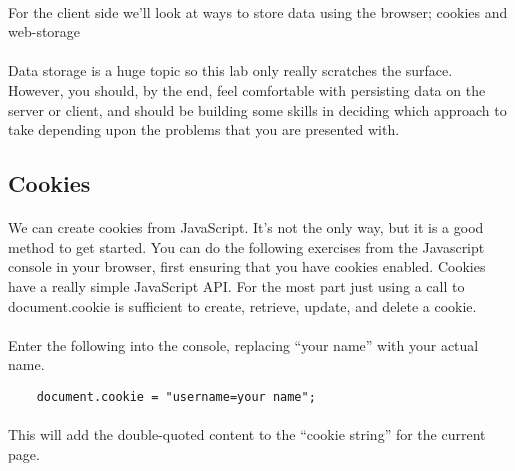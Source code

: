 \documentclass[10pt, a4paper, twosize]{article}
\begin{document}
\paragraph{} For the client side we'll look at ways to store data using the browser; cookies and web-storage%


\paragraph{} Data storage is a huge topic so this lab only really scratches the surface. However, you should, by the end, feel comfortable with persisting data on the server or client, and should be building some skills in deciding which approach to take depending upon the problems that you are presented with.

\subsection*{Cookies}
\paragraph{} We can create cookies from JavaScript. It's not the only way, but it is a good method to get started. You can do the following exercises from the Javascript console in your browser, first ensuring that you have cookies enabled. Cookies have a really simple JavaScript API. For the most part just using a call to document.cookie is sufficient to create, retrieve, update, and delete a cookie.

\paragraph{} Enter the following into the console, replacing ``your name'' with your actual name.
\begin{lstlisting}
    document.cookie = "username=your name";
\end{lstlisting}
\paragraph{} This will add the double-quoted content to the ``cookie string'' for the current page.
\end{document}
